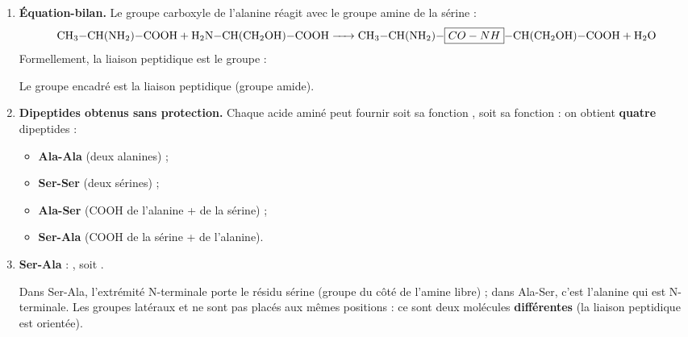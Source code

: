 \documentclass[11pt]{article}
\begin{document}
\begin{corrige}
\begin{enumerate}
\item \textbf{Équation-bilan.} Le groupe carboxyle de l'alanine réagit avec le groupe amine de la sérine :
\[ \ce{CH3-CH(NH2)-COOH + H2N-CH(CH2OH)-COOH -> CH3-CH(NH2)-\boxed{CO-NH}-CH(CH2OH)-COOH + H2O} \]
Formellement, la liaison peptidique est le groupe  :
\begin{center}
\end{center}
Le groupe  encadré est la liaison peptidique (groupe amide).
\item \textbf{Dipeptides obtenus sans protection.} Chaque acide aminé peut fournir soit sa fonction , soit sa fonction  : on obtient \textbf{quatre} dipeptides :
\begin{itemize}
\item \textbf{Ala-Ala} (deux alanines) ;
\item \textbf{Ser-Ser} (deux sérines) ;
\item \textbf{Ala-Ser} (COOH de l'alanine +  de la sérine) ;
\item \textbf{Ser-Ala} (COOH de la sérine +  de l'alanine).
\end{itemize}
\item \textbf{Ser-Ala} : , soit .

Dans Ser-Ala, l'extrémité N-terminale porte le résidu sérine (groupe  du côté de l'amine libre) ; dans Ala-Ser, c'est l'alanine qui est N-terminale. Les groupes latéraux  et  ne sont pas placés aux mêmes positions : ce sont deux molécules \textbf{différentes} (la liaison peptidique est orientée).
\end{enumerate}
\end{corrige}
\end{document}
